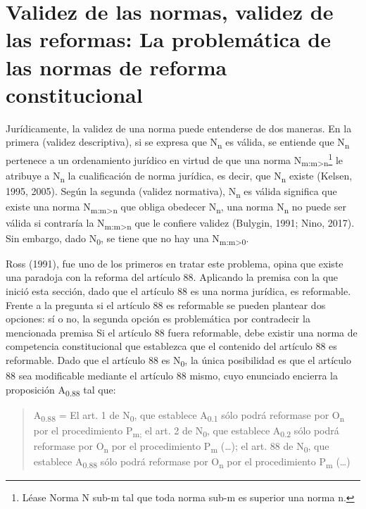 \documentclass[]{book}
\begin{document}
\section*{Validez de las normas, validez de las reformas: La problemática de las normas de reforma constitucional}

Jurídicamente, la validez de una norma puede entenderse de dos maneras.
En la primera (validez descriptiva), si se expresa que
N\textsubscript{n} es válida, se entiende que N\textsubscript{n}
pertenece a un ordenamiento jurídico en virtud de que una norma
N\textsubscript{m:m\textgreater{}n}\footnote{Léase Norma N sub-m tal que
  toda norma sub-m es superior una norma n.} le atribuye a
N\textsubscript{n} la cualificación de norma jurídica, es decir, que
N\textsubscript{n} existe (Kelsen, 1995, 2005). Según la segunda
(validez normativa), N\textsubscript{n} es válida significa que existe
una norma N\textsubscript{m:m\textgreater{}n} que obliga obedecer
N\textsubscript{n}, una norma N\textsubscript{n} no puede ser válida si
contraría la N\textsubscript{m:m\textgreater{}n} que le confiere validez
(Bulygin, 1991; Nino, 2017). Sin embargo, dado N\textsubscript{0}, se
tiene que no hay una N\textsubscript{m:m\textgreater{}0}.

Ross (1991), fue uno de los primeros en tratar este problema, opina que
existe una paradoja con la reforma del artículo 88. Aplicando la premisa
con la que inició esta sección, dado que el artículo 88 es una norma
jurídica, es reformable. Frente a la pregunta si el artículo 88 es
reformable se pueden plantear dos opciones: sí o no, la segunda opción
es problemática por contradecir la mencionada premisa Si el artículo 88
fuera reformable, debe existir una norma de competencia constitucional
que establezca que el contenido del artículo 88 es reformable. Dado que
el artículo 88 es N\textsubscript{0}, la única posibilidad es que el
artículo 88 sea modificable mediante el artículo 88 mismo, cuyo
enunciado encierra la proposición A\textsubscript{0.88} tal que:

\begin{quote}
A\textsubscript{0.88} = El art. 1 de N\textsubscript{0}, que establece
A\textsubscript{0.1} sólo podrá reformase por O\textsubscript{n} por el
procedimiento P\textsubscript{m;} el art. 2 de N\textsubscript{0}, que
establece A\textsubscript{0.2} sólo podrá reformase por
O\textsubscript{n} por el procedimiento P\textsubscript{m} (\ldots{});
el art. 88 de N\textsubscript{0}, que establece A\textsubscript{0.88}
sólo podrá reformase por O\textsubscript{n} por el procedimiento
P\textsubscript{m} (\ldots{})
\end{quote}
\end{document}
